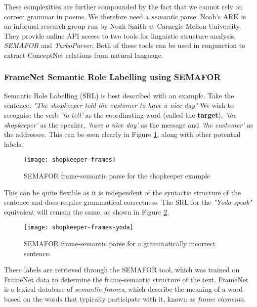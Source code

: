 These complexities are further compounded by the fact that we cannot rely on correct grammar in poems. We therefore need a \textit{semantic} parse. Noah's ARK is an informal research group run by Noah Smith at Carnegie Mellon University\cite{ark}. They provide online API access to two tools for linguistic structure analysis, \textit{SEMAFOR}\cite{chen2010semafor} and \textit{TurboParser}\cite{turboparser}. Both of these tools can be used in conjunction to extract ConceptNet relations from natural language.

\subsubsection{FrameNet Semantic Role Labelling using SEMAFOR}
\label{sec:sema}

Semantic Role Labelling (SRL) is best described with an example. Take the sentence:
{\centering\textit{"The shopkeeper told the customer to have a nice day"}}
We wish to recognise the verb \textit{'to tell'} as the coordinating word (called the \textbf{target}), \textit{'the shopkeeper'} as the speaker, \textit{'have a nice day'} as the message and \textit{'the customer'} as the addressee. This can be seen clearly in Figure \ref{fig:shopkeeper-frames}, along with other potential labels. 

\begin{figure}[h!]
\centering
\texttt{[image: shopkeeper-frames]}
\caption{SEMAFOR frame-semantic parse for the shopkeeper example}
\label{fig:shopkeeper-frames}
\end{figure}

This can be quite flexible as it is independent of the syntactic structure of the sentence and does require grammatical correctness. The SRL for the \textit{"Yoda-speak"} equivalent will remain the same, as shown in Figure \ref{fig:shopkeeper-frames-yoda}.

\begin{figure}[h!]
\centering
\texttt{[image: shopkeeper-frames-yoda]}
\caption{SEMAFOR frame-semantic parse for a grammatically incorrect sentence.}
\label{fig:shopkeeper-frames-yoda}
\end{figure}

These labels are retrieved through the SEMAFOR tool, which was trained on FrameNet data to determine the frame-semantic structure of the text. FrameNet\cite{baker1998berkeley} is a lexical database of \textit{semantic frames}, which describe the meaning of a word based on the words that typically participate with it, known as \textit{frame elements}.


